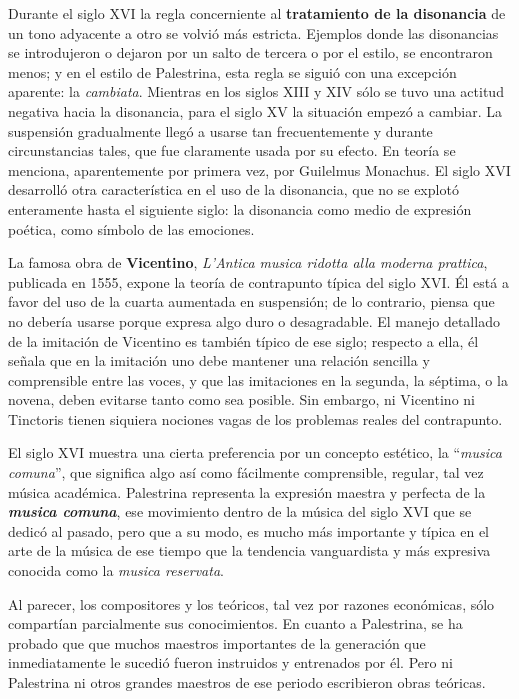 \documentclass[letterpaper,12pt]{book}
\theoremstyle{definition} \newtheorem{Def}{Definición}[chapter]
\theoremstyle{definition} \newtheorem{Teo}{Teorema}[chapter]
\theoremstyle{definition} \newtheorem{Pro}{Proposición}[chapter]
\theoremstyle{definition} \newtheorem{Lema}{Lema}[chapter]
\begin{document}
Durante el siglo XVI la regla concerniente al \textbf{tratamiento de la disonancia} de un tono adyacente a otro se volvió más estricta. Ejemplos donde las disonancias se introdujeron o dejaron por un salto de tercera o por el estilo, se encontraron menos; y en el estilo de Palestrina, esta regla se siguió con una excepción aparente: la \emph {cambiata}. 
Mientras en los siglos XIII y XIV sólo se tuvo una actitud negativa hacia la disonancia, para el siglo XV la situación empezó a cambiar. La suspensión gradualmente llegó a usarse tan frecuentemente y durante circunstancias tales, que fue claramente usada por su efecto. En teoría se menciona, aparentemente por primera vez, por Guilelmus Monachus.
El siglo XVI desarrolló otra característica en el uso de la disonancia, que no se explotó enteramente hasta el siguiente siglo: la disonancia como medio de expresión poética, como símbolo de las emociones.
  
La famosa obra de \textbf{Vicentino}, \emph{L'Antica musica ridotta alla moderna prattica}, publicada en 1555, expone la teoría de contrapunto típica del siglo XVI. Él está a favor del uso de la cuarta aumentada en suspensión; de lo contrario, piensa que no debería usarse porque expresa algo duro o desagradable. El manejo detallado de la imitación de Vicentino es también típico de ese siglo; respecto a ella, él señala que en la imitación uno debe mantener una relación sencilla y comprensible entre las voces, y que las imitaciones en la segunda, la séptima, o la novena, deben evitarse tanto como sea posible. Sin embargo, ni Vicentino ni Tinctoris tienen siquiera nociones vagas de los problemas reales del contrapunto.

El siglo XVI muestra una cierta preferencia por un concepto estético, la ``\emph{musica comuna}'', que significa algo así como fácilmente comprensible, regular, tal vez música académica. Palestrina  representa la expresión maestra y perfecta de la \textbf{\emph{musica comuna}}, ese movimiento dentro de la música del siglo XVI que se dedicó al pasado, pero que a su modo, es mucho más importante y típica en el arte de la música de ese tiempo que la tendencia vanguardista y más expresiva conocida como la \emph{musica reservata}.  

Al parecer, los compositores y los teóricos, tal vez por razones económicas, sólo compartían parcialmente sus conocimientos. En cuanto a Palestrina, se ha probado que que muchos maestros importantes de la generación que inmediatamente le sucedió fueron instruidos y entrenados por él. Pero ni Palestrina ni otros grandes maestros de ese periodo escribieron obras teóricas.
\end{document}
